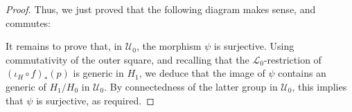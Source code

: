 \documentclass[12pt]{article}
\newcommand{\0}{\emptyset}
\newcommand{\Ualg}{\mathcal{U}_0}
\theoremstyle{plain}%
\theoremstyle{definition}
\theoremstyle{remark}
\begin{document}
\begin{proof}
Thus, we just proved that the following diagram makes sense, and commutes:

\begin{center}
\end{center}


It remains to prove that, in $\Ualg$, the morphism $\psi$ is surjective. Using commutativity of the outer square, and recalling that the $\mathcal{L}_0$-restriction of ${(\iota_H \circ f)}_*(p)$ is generic in $H_1$, we deduce that the image of $\psi$ contains an generic of $H_1 / H_0$ in $\Ualg$. By connectedness of the latter group in $\Ualg$, this implies that $\psi$ is surjective, as required.
\end{proof}



\end{document}
